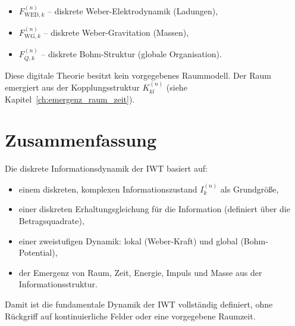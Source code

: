 \begin{itemize}
    \item \( F_{\text{WED},k}^{(n)} \) – diskrete Weber-Elektrodynamik (Ladungen),
    \item \( F_{\text{WG},k}^{(n)} \) – diskrete Weber-Gravitation (Massen),
    \item \( F_{Q,k}^{(n)} \) – diskrete Bohm-Struktur (globale Organisation).
\end{itemize}

Diese digitale Theorie besitzt kein vorgegebenes Raummodell. Der Raum emergiert aus der Kopplungsstruktur \( K_{kl}^{(n)} \) (siehe Kapitel~\ref{ch:emergenz_raum_zeit}).

\section{Zusammenfassung}
\label{sec:dynamik_zusammenfassung}

Die diskrete Informationsdynamik der IWT basiert auf:

\begin{itemize}
    \item einem diskreten, komplexen Informationszustand \( I_k^{(n)} \) als Grundgröße,
    \item einer diskreten Erhaltungsgleichung für die Information (definiert über die Betragsquadrate),
    \item einer zweistufigen Dynamik: lokal (Weber-Kraft) und global (Bohm-Potential),
    \item der Emergenz von Raum, Zeit, Energie, Impuls und Masse aus der Informationsstruktur.
\end{itemize}

Damit ist die fundamentale Dynamik der IWT vollständig definiert, ohne Rückgriff auf kontinuierliche Felder oder eine vorgegebene Raumzeit.